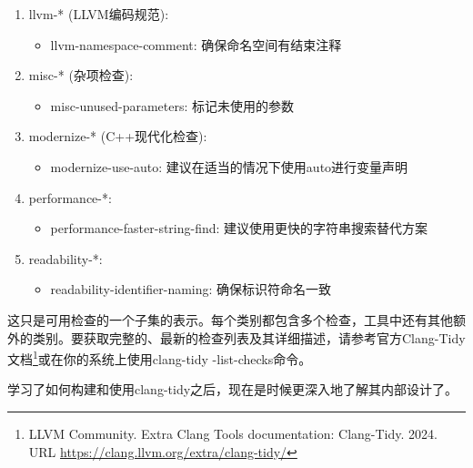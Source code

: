 \begin{enumerate}
\item
llvm-* (LLVM编码规范):

\begin{itemize}
\item
llvm-namespace-comment: 确保命名空间有结束注释
\end{itemize}

\item
misc-* (杂项检查):

\begin{itemize}
\item
misc-unused-parameters: 标记未使用的参数
\end{itemize}

\item
modernize-* (C++现代化检查):

\begin{itemize}
\item
modernize-use-auto: 建议在适当的情况下使用auto进行变量声明
\end{itemize}

\item
performance-*:

\begin{itemize}
\item
performance-faster-string-find: 建议使用更快的字符串搜索替代方案
\end{itemize}

\item
readability-*:

\begin{itemize}
\item
readability-identifier-naming: 确保标识符命名一致
\end{itemize}
\end{enumerate}

这只是可用检查的一个子集的表示。每个类别都包含多个检查，工具中还有其他额外的类别。要获取完整的、最新的检查列表及其详细描述，请参考官方Clang-Tidy文档\footnote{LLVM Community. Extra Clang Tools documentation: Clang-Tidy. 2024. URL \url{https://clang.llvm.org/extra/clang-tidy/}}或在你的系统上使用clang-tidy -list-checks命令。

学习了如何构建和使用clang-tidy之后，现在是时候更深入地了解其内部设计了。























